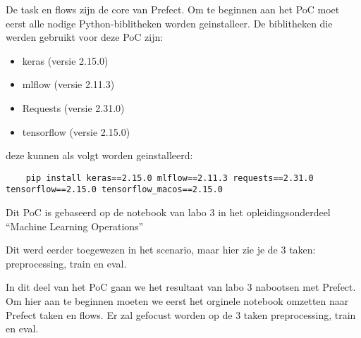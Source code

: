 De task en flows zijn de core van Prefect. Om te beginnen aan het PoC moet eerst alle nodige Python-biblitheken worden geinstalleer.
De biblitheken die werden gebruikt voor deze PoC zijn:
\begin{itemize}
    \item keras (versie 2.15.0)
    \item mlflow (versie 2.11.3)
    \item Requests (versie 2.31.0)
    \item tensorflow (versie 2.15.0)
\end{itemize}

deze kunnen als volgt worden geinstalleerd: 

\begin{verbatim}
    pip install keras==2.15.0 mlflow==2.11.3 requests==2.31.0 tensorflow==2.15.0 tensorflow_macos==2.15.0
\end{verbatim}

Dit PoC is gebaseerd op de notebook van labo 3 in het opleidingsonderdeel ``Machine Learning Operations''


Dit werd eerder toegewezen in het scenario, maar hier zie je de 3 taken: preprocessing, train en eval.

In dit deel van het PoC gaan we het resultaat van labo 3 nabootsen met Prefect.
Om hier aan te beginnen moeten we eerst het orginele notebook omzetten naar Prefect taken en flows. Er zal gefocust worden op de 3 taken preprocessing, train en eval.

